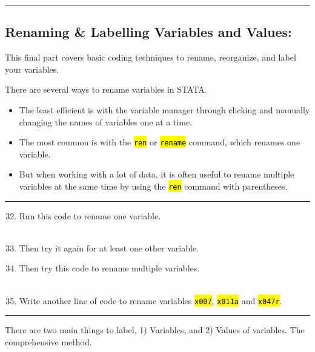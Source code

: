 \documentclass{tufte-handout}
\begin{document}
\bigskip
\hrule
\bigskip

\subsection{Renaming \& Labelling Variables and Values:}

This final part covers basic coding techniques to rename, reorganize, and label your variables.

\medskip
{}
\medskip

There are several ways to rename variables in STATA.

\begin{itemize}
	\item The least efficient is with the variable manager through clicking and manually changing the names of variables one at a time.
	\item The most common is with the {\tt \hl{ren}} or {\tt \hl{rename}} command, which renames one variable.
	\item But when working with a lot of data, it is often useful to rename multiple variables at the same time by using the {\tt \hl{ren}} command with parentheses.
\end{itemize}

\bigskip
\hrule
\bigskip

\begin{enumerate}[leftmargin=.5in]
\setcounter{enumi}{31}
	\item Run this code to rename one variable.\\
\medskip
{}\\
\medskip
	\item Then try it again for at least one other variable.
	\item Then try this code to rename multiple variables.\\
\medskip
{}\\
\medskip
	\item Write another line of code to rename variables {\tt \hl{x007}}, {\tt \hl{x011a}} and {\tt \hl{x047r}}.
\end{enumerate}

\bigskip
\hrule
\bigskip
	
\medskip
{}
\medskip

There are two main things to label, 1) Variables, and 2) Values of variables. 
The comprehensive method.
\end{document}
